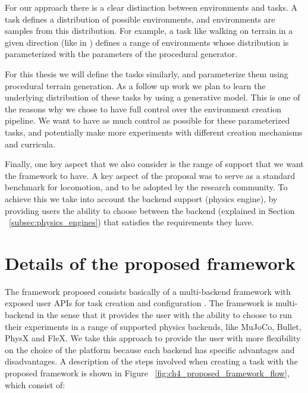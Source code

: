For our approach there is a clear distinction between environments and tasks. A task
defines a distribution of possible environments, and environments are samples from
this distribution. For example, a task like walking on terrain in a given direction 
(like in \cite{DeepTerrainRL}) defines a range of environments whose distribution
is parameterized with the parameters of the procedural generator.

For this thesis we will define the tasks similarly, and parameterize them using
procedural terrain generation. As a follow up work we plan to learn the underlying 
distribution of these tasks by using a generative model. This is one of the reasons
why we chose to have full control over the environment creation pipeline. We want
to have as much control as possible for these parameterized tasks, and potentially
make more experiments with different creation mechanisms and curricula.

Finally, one key aspect that we also consider is the range of support that we want the
framework to have. A key aspect of the proposal was to serve as a standard benchmark
for locomotion, and to be adopted by the research community. To achieve this we take
into account the backend support (physics engine), by providing users the ability
to choose between the backend (explained in Section ~\ref{subsec:physics_engines}) 
that satisfies the requirements they have.

\section{Details of the proposed framework}

The framework proposed consists basically of a multi-backend framework with exposed user APIs 
for task creation and configuration . The framework is multi-backend
in the sense that it provides the user with the ability to choose to run their experiments
in a range of supported physics backends, like MuJoCo, Bullet, PhysX and FleX. We take
this approach to provide the user with more flexibility on the choice of the platform because
each backend has specific advantages and disadvantages. A description of the steps involved 
when creating a task with the proposed framework is shown in Figure ~\ref{fig:ch4_proposed_framework_flow}, 
which consist of:

